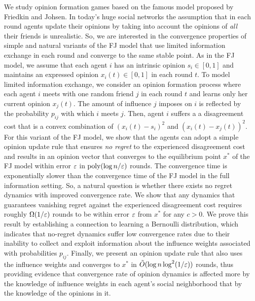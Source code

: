 We study opinion formation games based on the famous model proposed by Friedkin
and Johsen. In today's huge social networks the assumption that in each round
agents update their opinions by taking into account the opinions of \emph{all}
their friends is unrealistic. So, we are interested in the convergence
properties of simple and natural variants of the FJ model that use limited
information exchange in each round and converge to the same stable point.
%
As in the FJ model, we assume that each agent $i$ has an intrinsic opinion $s_i
\in [0,1]$ and maintains an expressed opinion $x_i(t) \in [0,1]$ in each round
$t$. To model limited information exchange, we consider an opinion formation
process where each agent $i$ meets with  one random friend $j$ in each round
$t$ and learns only her current opinion $x_j(t)$.  The amount of influence $j$
imposes on $i$ is reflected by the probability $p_{ij}$ with which $i$ meets
$j$. Then, agent $i$ suffers a a disagreement cost that is a convex combination
of $(x_i(t) - s_i)^2$ and $(x_i(t) - x_j(t))^2$.
%
For this variant of the FJ model, we show that the agents can adopt a simple
opinion update rule that ensures \emph{no regret} to the experienced
disagreement cost and results in an opinion vector that converges to the
equilibrium point $x^\ast$ of the FJ model within error $\varepsilon$ in
$\mathrm{poly}(\log n /\varepsilon)$ rounds.
%
The convergence time is exponentially slower than the convergence time of the
FJ model in the full information setting. So, a natural question is whether
there exists no regret dynamics with improved convergence rate. We show that any
dynamics that guarantees vanishing regret against the experienced disagreement
cost requires roughly $\Omega(1/\varepsilon)$ rounds to be within error $\varepsilon$ from
$x^{\ast}$ for any $c>0$. We prove this result by
establishing a connection to learning a Bernoulli distribution, which indicates
that no-regret dynamics suffer low convergence rates due to their inability to
collect and exploit information about the influence weights associated with
probabilities $p_{ij}$. Finally, we present an opinion update rule that also
uses the influence weights and converges to $x^\ast$ in
$\tilde{O}(\log n \log^2(1/\varepsilon))$ rounds, thus providing evidence that convergence
rate of opinion dynamics is affected more by the knowledge of influence weights
in each agent's social neighborhood that by the knowledge of the opinions in it.
